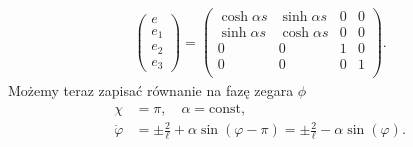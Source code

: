 \begin{align}\label{EHiper}
\begin{pmatrix}
e\\
e_1\\
e_2\\
e_3
\end{pmatrix}
=
\begin{pmatrix}
\cosh \alpha s & \sinh \alpha s & 0 &   0 \\
\sinh \alpha s & \cosh \alpha s & 0 &   0 \\
0 & 0 & 1 &   0 \\
0 & 0 & 0 &   1 \\
\end{pmatrix}.
\end{align}
Możemy teraz zapisać równanie na fazę zegara $\phi$ 
\begin{align*}
\chi &= \pi, \quad \alpha = \text{const,} \\
\dot{\varphi} &= \pm \frac{2}{\ell} + \alpha \sin ( \varphi - \pi )
 = \pm \frac{2}{\ell} -  \alpha \sin ( \varphi ).
\end{align*}
